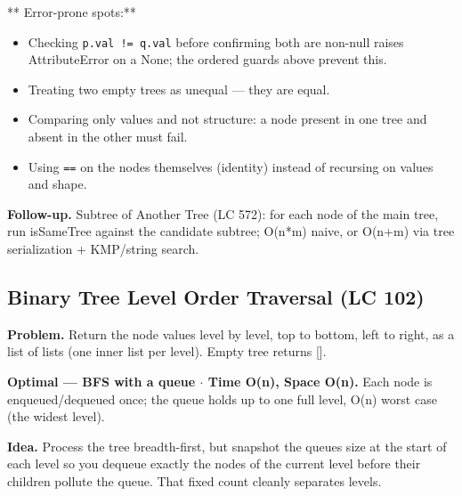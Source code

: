 \documentclass[11pt]{article}
\providecommand{\tightlist}{\setlength{\itemsep}{1pt}\setlength{\parskip}{0pt}}
\begin{document}
** Error-prone spots:**

\begin{itemize}
\tightlist
\item
  Checking \texttt{p.val\ !=\ q.val} before confirming both are non-null raises AttributeError on a None; the ordered guards above prevent this.
\item
  Treating two empty trees as unequal --- they are equal.
\item
  Comparing only values and not structure: a node present in one tree and absent in the other must fail.
\item
  Using \texttt{==} on the nodes themselves (identity) instead of recursing on values and shape.
\end{itemize}

\textbf{Follow-up.} Subtree of Another Tree (LC 572): for each node of the main tree, run isSameTree against the candidate subtree; O(n*m) naive, or O(n+m) via tree serialization + KMP/string search.

\subsection{Binary Tree Level Order Traversal (LC 102)}\label{binary-tree-level-order-traversal-lc-102}

\textbf{Problem.} Return the node values level by level, top to bottom, left to right, as a list of lists (one inner list per level). Empty tree returns {[}{]}.

\textbf{Optimal --- BFS with a queue \(\cdot\) Time O(n), Space O(n).} Each node is enqueued/dequeued once; the queue holds up to one full level, O(n) worst case (the widest level).

\textbf{Idea.} Process the tree breadth-first, but snapshot the queue\textquotesingle s size at the start of each level so you dequeue exactly the nodes of the current level before their children pollute the queue. That fixed count cleanly separates levels.

\end{document}
